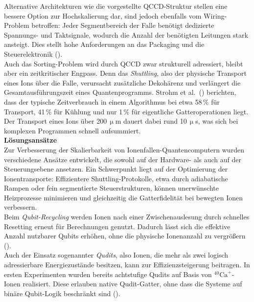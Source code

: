 Alternative Architekturen wie die vorgestellte QCCD-Struktur stellen eine bessere Option zur Hochskalierung dar, sind jedoch ebenfalls vom Wiring-Problem betroffen: Jeder Segmentbereich der Falle benötigt dedizierte Spannungs- und Taktsignale, wodurch die Anzahl der benötigten Leitungen stark ansteigt. Dies stellt hohe Anforderungen an das Packaging und die Steuerelektronik (\cite{strohmIonBasedQuantumComputing2024}). \\

Auch das Sorting-Problem wird durch QCCD zwar strukturell adressiert, bleibt aber ein zeitkritischer Engpass. Denn das \textit{Shuttling}, also der physische Transport eines Ions über die Falle, verursacht zusätzliche Dekohärenz und verlängert die Gesamtausführungszeit eines Quantenprogramms. Strohm et al.\ (\cite{strohmIonBasedQuantumComputing2024}) berichten, dass der typische Zeitverbrauch in einem Algorithmus bei etwa 58\,\% für Transport, 41\,\% für Kühlung und nur 1\,\% für eigentliche Gatteroperationen liegt. Der Transport eines Ions über 200\,$\upmu$m dauert dabei rund 10\,$\upmu$s, was sich bei komplexen Programmen schnell aufsummiert. \\

\textbf{Lösungsansätze} \\
Zur Verbesserung der Skalierbarkeit von Ionenfallen-Quantencomputern wurden verschiedene Ansätze entwickelt, die sowohl auf der Hardware- als auch auf der Steuerungsebene ansetzen. Ein Schwerpunkt liegt auf der Optimierung der Ionentransporte: Effizientere Shuttling-Protokolle, etwa durch adiabatische Rampen oder fein segmentierte Steuerstrukturen, können unerwünschte Heizprozesse minimieren und gleichzeitig die Gatterfidelität bei bewegten Ionen verbessern. \\

Beim \textit{Qubit-Recycling} werden Ionen nach einer Zwischenauslesung durch schnelles Resetting erneut für Berechnungen genutzt. Dadurch lässt sich die effektive Anzahl nutzbarer Qubits erhöhen, ohne die physische Ionenanzahl zu vergrößern (\cite{strohmIonBasedQuantumComputing2024}). \\

Auch der Einsatz sogenannter \textit{Qudits}, also Ionen, die mehr als zwei logisch adressierbare Energiezustände besitzen, kann zur Effizienzsteigerung beitragen. In ersten Experimenten wurden bereits achtstufige Qudits auf Basis von $^{40}\mathrm{Ca}^{+}$-Ionen realisiert. Diese erlauben native Qudit-Gatter, ohne dass die Systeme auf binäre Qubit-Logik beschränkt sind (\cite{strohmIonBasedQuantumComputing2024}).

